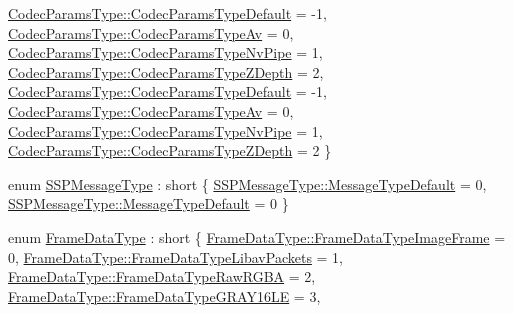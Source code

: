 \begin{DoxyCompactItemize}
\hyperlink{namespacemoetsi_1_1ssp_a6d638ba0bd38e9daded08f633d893563a1ffd3a6c06641b95d3e5142403ed0730}{Codec\+Params\+Type\+::\+Codec\+Params\+Type\+Default} = -\/1, 
\hyperlink{namespacemoetsi_1_1ssp_a6d638ba0bd38e9daded08f633d893563a55e78e5ce82b1d5dcfbb2381af26698f}{Codec\+Params\+Type\+::\+Codec\+Params\+Type\+Av} = 0, 
\hyperlink{namespacemoetsi_1_1ssp_a6d638ba0bd38e9daded08f633d893563ac818f912b0dd4cd2868a1a03d5c570a1}{Codec\+Params\+Type\+::\+Codec\+Params\+Type\+Nv\+Pipe} = 1, 
\hyperlink{namespacemoetsi_1_1ssp_a6d638ba0bd38e9daded08f633d893563a4e738f8ec62ed2fd5d5675f71b291992}{Codec\+Params\+Type\+::\+Codec\+Params\+Type\+Z\+Depth} = 2, 
\newline
\hyperlink{namespacemoetsi_1_1ssp_a6d638ba0bd38e9daded08f633d893563a1ffd3a6c06641b95d3e5142403ed0730}{Codec\+Params\+Type\+::\+Codec\+Params\+Type\+Default} = -\/1, 
\hyperlink{namespacemoetsi_1_1ssp_a6d638ba0bd38e9daded08f633d893563a55e78e5ce82b1d5dcfbb2381af26698f}{Codec\+Params\+Type\+::\+Codec\+Params\+Type\+Av} = 0, 
\hyperlink{namespacemoetsi_1_1ssp_a6d638ba0bd38e9daded08f633d893563ac818f912b0dd4cd2868a1a03d5c570a1}{Codec\+Params\+Type\+::\+Codec\+Params\+Type\+Nv\+Pipe} = 1, 
\hyperlink{namespacemoetsi_1_1ssp_a6d638ba0bd38e9daded08f633d893563a4e738f8ec62ed2fd5d5675f71b291992}{Codec\+Params\+Type\+::\+Codec\+Params\+Type\+Z\+Depth} = 2
 \}
\item 
enum \hyperlink{namespacemoetsi_1_1ssp_a8948545ffe48a5b3507fd10a1e56d546}{S\+S\+P\+Message\+Type} \+: short \{ \hyperlink{namespacemoetsi_1_1ssp_a8948545ffe48a5b3507fd10a1e56d546a16d065ca1ae16532bc3115ec68734080}{S\+S\+P\+Message\+Type\+::\+Message\+Type\+Default} = 0, 
\hyperlink{namespacemoetsi_1_1ssp_a8948545ffe48a5b3507fd10a1e56d546a16d065ca1ae16532bc3115ec68734080}{S\+S\+P\+Message\+Type\+::\+Message\+Type\+Default} = 0
 \}
\item 
enum \hyperlink{namespacemoetsi_1_1ssp_aa9b059f0bc7a91855545ee887f2d56c4}{Frame\+Data\+Type} \+: short \{ \newline
\hyperlink{namespacemoetsi_1_1ssp_aa9b059f0bc7a91855545ee887f2d56c4a6f466822a5d24eab84554c0bf415903d}{Frame\+Data\+Type\+::\+Frame\+Data\+Type\+Image\+Frame} = 0, 
\hyperlink{namespacemoetsi_1_1ssp_aa9b059f0bc7a91855545ee887f2d56c4a234b11a09d69865a40eb4db132fe7096}{Frame\+Data\+Type\+::\+Frame\+Data\+Type\+Libav\+Packets} = 1, 
\hyperlink{namespacemoetsi_1_1ssp_aa9b059f0bc7a91855545ee887f2d56c4ac2cdf85544553bda5453b401b79964eb}{Frame\+Data\+Type\+::\+Frame\+Data\+Type\+Raw\+R\+G\+BA} = 2, 
\hyperlink{namespacemoetsi_1_1ssp_aa9b059f0bc7a91855545ee887f2d56c4a44d909233498ad3dec5a3e3e95e908ca}{Frame\+Data\+Type\+::\+Frame\+Data\+Type\+G\+R\+A\+Y16\+LE} = 3, 

\end{DoxyCompactItemize}
